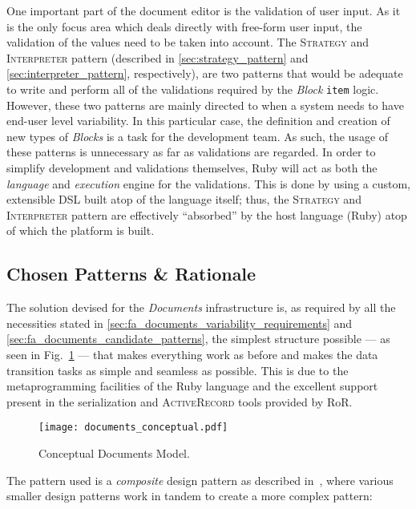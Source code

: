 One important part of the document editor is the validation of user input. As it is the only focus area which deals directly with free-form user input, the validation of the values need to be taken into account. The \textsc{Strategy} and \textsc{Interpreter} pattern (described in \ref{sec:strategy_pattern} and \ref{sec:interpreter_pattern}, respectively), are two patterns that would be adequate to write and perform all of the validations required by the \emph{Block} \texttt{item} logic. However, these two patterns are mainly directed to when a system needs to have end-user level variability. In this particular case, the definition and creation of new types of \emph{Blocks} is a task for the development team. As such, the usage of these patterns is unnecessary as far as validations are regarded. In order to simplify development and validations themselves, Ruby will act as both the \emph{language} and \emph{execution} engine for the validations. This is done by using a custom, extensible DSL built atop of the language itself; thus, the \textsc{Strategy} and \textsc{Interpreter} pattern are effectively ``absorbed'' by the host language (Ruby) atop of which the platform is built.

\subsection{Chosen Patterns \& Rationale}\label{sec:fa_documents_chosen_patterns_rationale}

The solution devised for the \emph{Documents} infrastructure is, as required by all the necessities stated in \ref{sec:fa_documents_variability_requirements} and \ref{sec:fa_documents_candidate_patterns}, the simplest structure possible --- as seen in Fig.~\ref{fig:documents_conceptual} --- that makes everything work as before and makes the data transition tasks as simple and seamless as possible. This is due to the metaprogramming facilities of the Ruby language and the excellent support present in the serialization and \textsc{ActiveRecord} tools provided by RoR.

\begin{figure}[H]
  \centering
  \texttt{[image: documents\_conceptual.pdf]}
  \caption{Conceptual Documents Model.}
  \label{fig:documents_conceptual}
\end{figure}

The pattern used is a \emph{composite} design pattern as described in~\cite{riehle_composite_patterns}, where various smaller design patterns work in tandem to create a more complex pattern:

